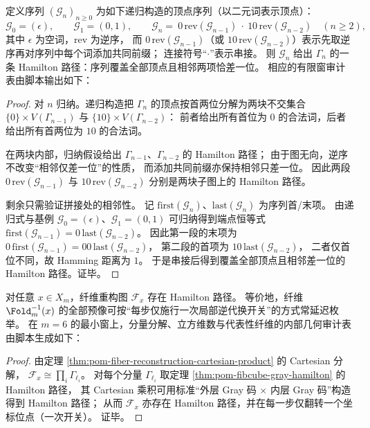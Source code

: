 \begin{theorem}\label{thm:pom-fibcube-gray-hamilton}
定义序列 \((\mathcal G_n)_{n\ge 0}\) 为如下递归构造的顶点序列（以二元词表示顶点）：
\[
\mathcal G_0=(\epsilon),\qquad
\mathcal G_1=(0,1),\qquad
\mathcal G_n=\ 0\,\mathrm{rev}(\mathcal G_{n-1})\ \cdot\ 10\,\mathrm{rev}(\mathcal G_{n-2})\quad(n\ge 2),
\]
其中 \(\epsilon\) 为空词，\(\mathrm{rev}\) 为逆序，
而 \(0\,\mathrm{rev}(\mathcal G_{n-1})\)（或 \(10\,\mathrm{rev}(\mathcal G_{n-2})\)）表示先取逆序再对序列中每个词添加共同前缀；
连接符号“\(\cdot\)”表示串接。
则 \(\mathcal G_n\) 给出 \(\Gamma_n\) 的一条 Hamilton 路径：序列覆盖全部顶点且相邻两项恰差一位。
相应的有限窗审计表由脚本输出如下：

\end{theorem}

\begin{proof}
对 \(n\) 归纳。递归构造把 \(\Gamma_n\) 的顶点按首两位分解为两块不交集合
\(
\{0\}\times V(\Gamma_{n-1})
\)
与
\(
\{10\}\times V(\Gamma_{n-2})
\)：
前者给出所有首位为 \(0\) 的合法词，后者给出所有首两位为 \(10\) 的合法词。
\par
在两块内部，归纳假设给出 \(\Gamma_{n-1}\)、\(\Gamma_{n-2}\) 的 Hamilton 路径；
由于图无向，逆序不改变“相邻仅差一位”的性质，
而添加共同前缀亦保持相邻只差一位。
因此两段
\(
0\,\mathrm{rev}(\mathcal G_{n-1})
\)
与
\(
10\,\mathrm{rev}(\mathcal G_{n-2})
\)
分别是两块子图上的 Hamilton 路径。
\par
剩余只需验证拼接处的相邻性。
记 \(\mathrm{first}(\mathcal G_n)\)、\(\mathrm{last}(\mathcal G_n)\) 为序列首/末项。
由递归式与基例 \(\mathcal G_0=(\epsilon)\)、\(\mathcal G_1=(0,1)\) 可归纳得到端点恒等式
\(
\mathrm{first}(\mathcal G_{n-1})=0\,\mathrm{last}(\mathcal G_{n-2})
\)。
因此第一段的末项为
\(
0\,\mathrm{first}(\mathcal G_{n-1})=00\,\mathrm{last}(\mathcal G_{n-2})
\)，
第二段的首项为
\(
10\,\mathrm{last}(\mathcal G_{n-2})
\)，
二者仅首位不同，故 Hamming 距离为 \(1\)。
于是串接后得到覆盖全部顶点且相邻差一位的 Hamilton 路径。证毕。
\end{proof}

\begin{corollary}\label{cor:pom-fiber-constant-delay-traversal}
对任意 \(x\in X_m\)，纤维重构图 \(\mathcal F_x\) 存在 Hamilton 路径。
等价地，纤维 \(\Fold_m^{-1}(x)\) 的全部预像可按“每步仅施行一次局部逆代换开关”的方式常延迟枚举。
在 \(m=6\) 的最小窗上，分量分解、立方维数与代表性纤维的内部几何审计表由脚本生成如下：

\end{corollary}
\begin{proof}
由定理 \ref{thm:pom-fiber-reconstruction-cartesian-product} 的 Cartesian 分解，
\(
\mathcal F_x\cong \prod_i \Gamma_{\ell_i}
\)。
对每个分量 \(\Gamma_{\ell_i}\) 取定理 \ref{thm:pom-fibcube-gray-hamilton} 的 Hamilton 路径，
其 Cartesian 乘积可用标准“外层 Gray 码 \(\times\) 内层 Gray 码”构造得到 Hamilton 路径；
从而 \(\mathcal F_x\) 亦存在 Hamilton 路径，并在每一步仅翻转一个坐标位点（一次开关）。
证毕。
\end{proof}


